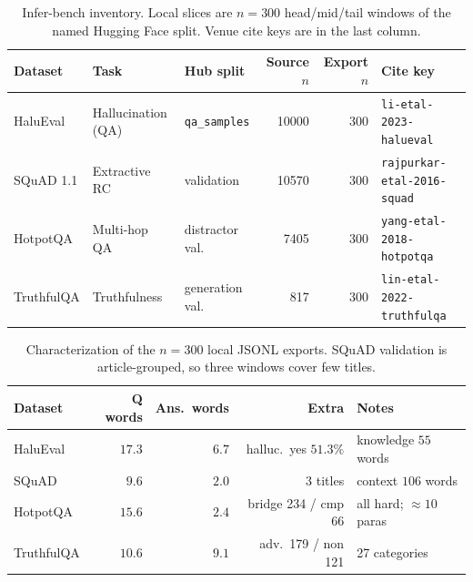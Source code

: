 
\begin{table}[ht]
\centering
\caption{Infer-bench inventory. Local slices are $n=300$ head/mid/tail
windows of the named Hugging Face split. Venue cite keys are in the last column.}
\label{tab:infer-bench-inventory}
\small
\setlength{\tabcolsep}{3.5pt}
\begin{tabular}{@{}l l l r r l@{}}
\toprule
Dataset & Task & Hub split & Source $n$ & Export $n$ & Cite key \\
\midrule
HaluEval & Hallucination (QA) & \texttt{qa\_samples} & 10000 & 300 & \texttt{li-etal-2023-halueval} \\
SQuAD 1.1 & Extractive RC & validation & 10570 & 300 & \texttt{rajpurkar-etal-2016-squad} \\
HotpotQA & Multi-hop QA & distractor val. & 7405 & 300 & \texttt{yang-etal-2018-hotpotqa} \\
TruthfulQA & Truthfulness & generation val. & 817 & 300 & \texttt{lin-etal-2022-truthfulqa} \\
\bottomrule
\end{tabular}
\end{table}

\begin{table}[ht]
\centering
\caption{Characterization of the $n=300$ local JSONL exports.
SQuAD validation is article-grouped, so three windows cover few titles.}
\label{tab:infer-bench-slice}
\small
\setlength{\tabcolsep}{4pt}
\begin{tabular}{@{}l r r r l@{}}
\toprule
Dataset & Q words & Ans.\ words & Extra & Notes \\
\midrule
HaluEval & $17.3$ & $6.7$ & halluc.\ yes $51.3\%$ & knowledge $55$ words \\
SQuAD & $9.6$ & $2.0$ & 3 titles & context $106$ words \\
HotpotQA & $15.6$ & $2.4$ & bridge 234 / cmp 66 & all hard; $\approx 10$ paras \\
TruthfulQA & $10.6$ & $9.1$ & adv.\ 179 / non 121 & 27 categories \\
\bottomrule
\end{tabular}
\end{table}

